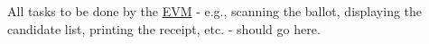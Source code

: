 All tasks to be done by the \mbox{\hyperlink{class_e_v_m}{E\+VM}} -\/ e.\+g., scanning the ballot, displaying the candidate list, printing the receipt, etc. -\/ should go here. 